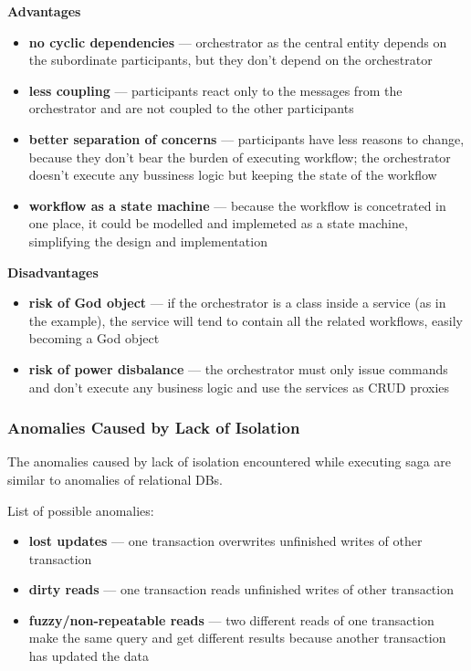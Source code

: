 \documentclass[thesis=M,english,hidelinks]{FITthesis}[2012/10/20]
\begin{document}
\vspace{1em}
\noindent
\textbf{Advantages}
\begin{itemize}
    \item \textbf{no cyclic dependencies} --- orchestrator as the central entity depends on the subordinate participants, but they don't depend on the orchestrator
    \item \textbf{less coupling} --- participants react only to the messages from the orchestrator and are not coupled to the other participants
    \item \textbf{better separation of concerns} --- participants have less reasons to change, because they don't bear the burden of executing workflow; the orchestrator doesn't execute any bussiness logic but keeping the state of the workflow
    \item \textbf{workflow as a state machine} --- because the workflow is concetrated in one place, it could be modelled and implemeted as a state machine, simplifying the design and implementation
\end{itemize}

\noindent
\textbf{Disadvantages}
\begin{itemize}
    \item \textbf{risk of God object} --- if the orchestrator is a class inside a service (as in the example), the service will tend to contain all the related workflows, easily becoming a God object~\cite{wiki-god-object}
    \item \textbf{risk of power disbalance} --- the orchestrator must only issue commands and don't execute any business logic and use the services as \acrshort{CRUD} proxies
\end{itemize}

\subsubsection{Anomalies Caused by Lack of Isolation}
The anomalies caused by lack of isolation encountered while executing saga are similar to anomalies of relational \acrshort{DB}s. 

\vspace{1em}
\noindent
List of possible anomalies:
\begin{itemize}
    \item \textbf{lost updates} --- one transaction overwrites unfinished writes of other transaction
    \item \textbf{dirty reads} --- one transaction reads unfinished writes of other transaction
    \item \textbf{fuzzy/non-repeatable reads} --- two different reads of one transaction make the same query and get different results because another transaction has updated the data
\end{itemize}
\end{document}
